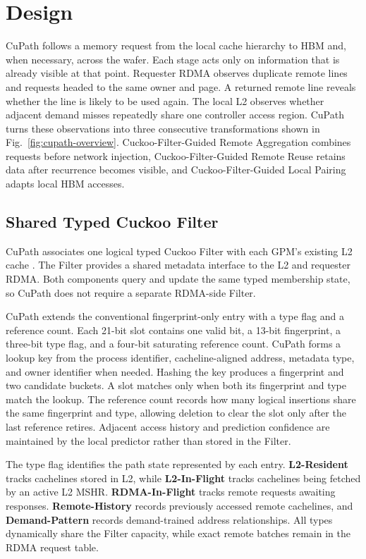 \section{Design}
\label{sec:design}

CuPath follows a memory request from the local cache hierarchy to HBM and,
when necessary, across the wafer. Each stage acts only on information that is
already visible at that point. Requester RDMA observes duplicate remote lines
and requests headed to the same owner and page. A returned remote line reveals
whether the line is likely to be used again. The local L2 observes whether
adjacent demand misses repeatedly share one controller access region.
CuPath turns these observations into three consecutive transformations shown
in Fig.~\ref{fig:cupath-overview}. Cuckoo-Filter-Guided Remote Aggregation
combines requests before network injection, Cuckoo-Filter-Guided Remote Reuse
retains data after recurrence becomes visible, and Cuckoo-Filter-Guided Local
Pairing adapts local HBM accesses.

\subsection{Shared Typed Cuckoo Filter}

CuPath associates one logical typed Cuckoo Filter with each GPM's existing L2
cache \cite{fan2014cuckoo}. The Filter provides a shared metadata interface to
the L2 and requester RDMA. Both components query and update the same typed
membership state, so CuPath does not require a separate RDMA-side Filter.

CuPath extends the conventional fingerprint-only entry with a type flag and a
reference count. Each 21-bit slot contains one valid bit, a 13-bit
fingerprint, a three-bit type flag, and a four-bit saturating reference count.
CuPath forms a lookup key from the process identifier, cacheline-aligned
address, metadata type, and owner identifier when needed. Hashing the key
produces a fingerprint and two candidate buckets. A slot matches only when
both its fingerprint and type match the lookup. The reference count records
how many logical insertions share the same fingerprint and type, allowing
deletion to clear the slot only after the last reference retires. Adjacent
access history and prediction confidence are maintained by the local
predictor rather than stored in the Filter.

The type flag identifies the path state represented by each entry.
\textbf{L2-Resident} tracks cachelines stored in L2, while
\textbf{L2-In-Flight} tracks cachelines being fetched by an active L2 MSHR.
\textbf{RDMA-In-Flight} tracks remote requests awaiting responses.
\textbf{Remote-History} records previously accessed remote cachelines, and
\textbf{Demand-Pattern} records demand-trained address relationships. All
types dynamically share the Filter capacity, while exact remote batches remain
in the RDMA request table.

